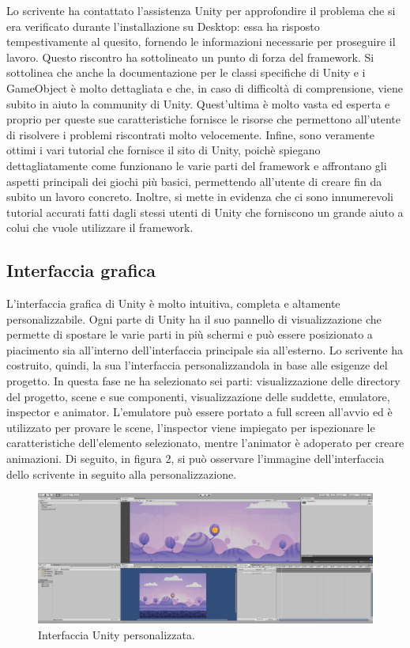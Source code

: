 Lo scrivente ha contattato l’assistenza Unity per approfondire il problema che si era verificato durante l’installazione su Desktop: essa ha risposto tempestivamente al quesito, fornendo le informazioni necessarie per proseguire il lavoro. Questo riscontro ha sottolineato un punto di forza del framework.
Si sottolinea che anche la documentazione per le classi specifiche di Unity e i GameObject è molto dettagliata e che, in caso di difficoltà di comprensione, viene subito in aiuto la community di Unity. Quest’ultima è molto vasta ed esperta e proprio per queste sue caratteristiche fornisce le risorse che permettono all’utente di risolvere i problemi riscontrati molto velocemente. 
Infine, sono veramente ottimi i vari tutorial che fornisce il sito di Unity, poichè spiegano dettagliatamente come funzionano le varie parti del framework e affrontano gli aspetti principali dei giochi più basici, permettendo all’utente di creare fin da subito un lavoro concreto. Inoltre, si mette in evidenza che ci sono innumerevoli tutorial accurati fatti dagli stessi utenti di Unity che forniscono un grande aiuto a colui che vuole utilizzare il framework.

\subsection{Interfaccia grafica}

L’interfaccia grafica di Unity è molto intuitiva, completa e altamente personalizzabile. Ogni parte di Unity ha il suo pannello di visualizzazione che permette di spostare le varie parti in più schermi e può essere posizionato a piacimento sia all’interno dell’interfaccia principale sia all’esterno.
Lo scrivente ha costruito, quindi, la sua l’interfaccia personalizzandola in base alle esigenze del progetto. In questa fase ne ha selezionato sei parti: visualizzazione delle directory del progetto, scene e sue componenti, visualizzazione delle suddette, emulatore, inspector e animator. L’emulatore può essere portato a full screen all’avvio ed è utilizzato per provare le scene, l’inspector viene impiegato per ispezionare le caratteristiche dell’elemento selezionato, mentre l’animator è adoperato per creare animazioni. Di seguito, in figura 2, si può osservare l’immagine dell’interfaccia dello scrivente in seguito alla personalizzazione.

	\begin{figure}[h]
	\centering
	\includegraphics [width=\textwidth]{img/Unity_organizzazione.png}
	\caption{\label{fig:interface} Interfaccia Unity personalizzata.}
	\end{figure}

